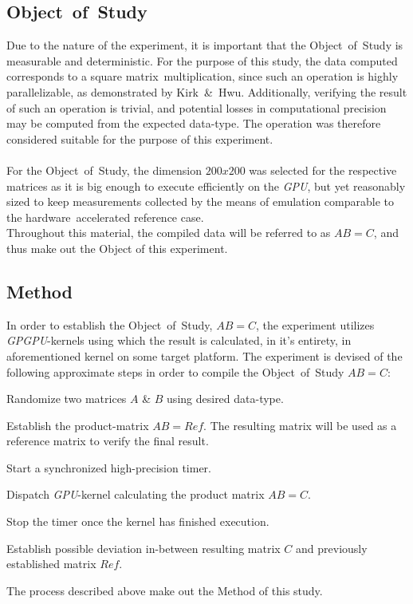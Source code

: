 \documentclass[fleqn,10pt]{SelfArx} %
\begin{document}
\subsection{Object~of~Study}
\label{sec:contribution:objectofstudy}
Due to the nature of the experiment, it is important that the Object~of~Study is measurable and deterministic. For the purpose of this study, the data computed corresponds to a square matrix~multiplication, since such an operation is highly parallelizable, as demonstrated by Kirk~\&~Hwu\cite[ch.~3]{Kirk:2010:PMP:1841511}. Additionally, verifying the result of such an operation is trivial, and potential losses in computational precision may be computed from the expected data-type. The operation was therefore considered suitable for the purpose of this experiment.\\
\\
For the Object~of~Study, the dimension $200x200$ was selected for the respective matrices as it is big enough to execute efficiently on the \textit{GPU}, but yet reasonably sized to keep measurements collected by the means of emulation comparable to the hardware~accelerated reference case. \\
Throughout this material, the compiled data will be referred to as $AB=C$, and thus make out the Object of this experiment.

\subsection{Method}
\label{sec:contribution:method}
In order to establish the Object~of~Study, $AB=C$, the experiment utilizes \textit{GPGPU}-kernels using which the result is calculated, in it’s entirety, in aforementioned kernel on some target platform. The experiment is devised of the following approximate steps in order to compile the Object~of~Study $AB=C$:
\begin{enumerate*}
	\item Randomize two matrices $A$ \& $B$ using desired data-type.
	\item Establish the product-matrix $AB=Ref$. The resulting matrix will be used as a reference matrix to verify the final result.
	\item Start a synchronized high-precision timer.
	\item Dispatch \textit{GPU}-kernel calculating the product matrix $AB=C$.
	\item Stop the timer once the kernel has finished execution.
	\item Establish possible deviation in-between resulting matrix $C$ and previously established matrix $Ref$.
\end{enumerate*}
The process described above make out the Method of this study.
\end{document}
